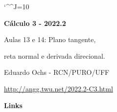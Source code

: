 \documentclass[oneside,12pt]{article}
\begin{document}
\catcode`\^^J=10
\pu
\def\pictgridstyle{\color{GrayPale}\linethickness{0.3pt}}
\def\pictaxesstyle{\linethickness{0.5pt}}
\def\pictnaxesstyle{\color{GrayPale}\linethickness{0.5pt}}
\celllower=2.5pt


\def\u#1{\par{\footnotesize \url{#1}}}

\def\drafturl{http://angg.twu.net/LATEX/2022-2-C3.pdf}
\def\drafturl{http://angg.twu.net/2022.2-C3.html}
\def\draftfooter{\tiny \href{\drafturl}{\jobname{}} \ColorBrown{\shorttoday{} \hours}}



%

\thispagestyle{empty}

\begin{center}

\vspace*{1.2cm}

{\bf \Large Cálculo 3 - 2022.2}

\bsk

Aulas 13 e 14: Plano tangente,

reta normal e derivada direcional.

\bsk

Eduardo Ochs - RCN/PURO/UFF

\url{http://angg.twu.net/2022.2-C3.html}

\end{center}

\newpage


{\bf Links}

\end{document}
